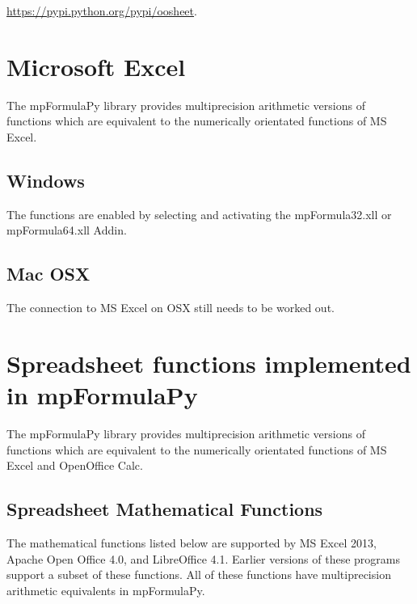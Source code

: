 \vpara
\href{https://pypi.python.org/pypi/oosheet}{https://pypi.python.org/pypi/oosheet}. 


\newpage
\section{Microsoft Excel}
The mpFormulaPy library provides multiprecision arithmetic versions of  functions which are equivalent to the numerically orientated functions of MS Excel.


\subsection{Windows}
The functions are enabled by selecting and activating the mpFormula32.xll or mpFormula64.xll Addin.


\subsection{Mac OSX}
The connection to MS Excel on OSX still needs to be worked out.




\newpage
\section{Spreadsheet functions implemented in mpFormulaPy}
\label{Using Spreadsheet functions}
The mpFormulaPy library provides multiprecision arithmetic versions of  functions which are equivalent to the numerically orientated functions of MS Excel and OpenOffice Calc.


\subsection{Spreadsheet Mathematical Functions}
The mathematical functions listed below are supported by MS Excel 2013, Apache Open Office 4.0, and LibreOffice 4.1. Earlier versions of these programs support a subset of these functions.
All of these functions have multiprecision arithmetic equivalents in mpFormulaPy.

